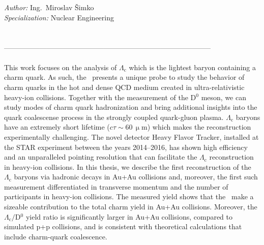 \pagestyle{fancy}
\mbox{}
\newpage

\\
{\bf \engtitle}\\

\noindent
{\it Author:}        Ing.\ Miroslav Šimko \\

\noindent
{\it Specialization:}     Nuclear Engineering\\


 \skolitel \\

 \konzultant\\  
--------------------------------------------------------------------------------------- \\

 \\
\noindent  This work focuses on the analysis of $\Lambda_\mathrm{c}$ which is the lightest baryon containing a charm quark. As such, the \Lambdac\ presents a unique probe to study
the behavior of charm quarks in the hot and dense QCD medium created in ultra-relativistic heavy-ion collisions. Together with the measurement of the D$^0$ meson,
we can study modes of charm quark hadronization and bring additional insights into the  quark coalescense process in the strongly coupled quark-gluon plasma.
$\Lambda_\mathrm{c}$ baryons have an extremely short lifetime ($c \tau \sim 60\,\upmu$m) which makes the reconstruction experimentally challenging. The novel detector Heavy Flavor Tracker, installed at the STAR experiment between the years 2014--2016, has
shown high efficiency and an unparalleled pointing resolution that can facilitate the $\Lambda_\mathrm{c}$ reconstruction  in heavy-ion collisions.
In this thesis, we describe the first reconstruction of the $\Lambda_\mathrm{c}$ baryons via hadronic decays in Au+Au collisions and, moreover, the first such measurement differentiated in transverse momentum and the number of participants in heavy-ion collisions. The measured yield shows that the \Lambdac\ make a sizeable contribution to the total charm yield in Au+Au collisions. Moreover, the $\Lambda_\mathrm{c}/$D$^0$ yield ratio is significantly larger in Au+Au collisions, compared to simulated p+p collisions, and is consistent with theoretical calculations that include charm-quark coalescence.
\\

